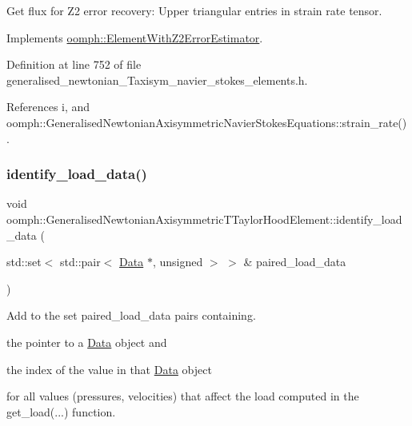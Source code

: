 Get \textquotesingle{}flux\textquotesingle{} for Z2 error recovery\+: Upper triangular entries in strain rate tensor. 



Implements \hyperlink{classoomph_1_1ElementWithZ2ErrorEstimator_a5688ff5f546d81771cabad82ca5a7556}{oomph\+::\+Element\+With\+Z2\+Error\+Estimator}.



Definition at line 752 of file generalised\+\_\+newtonian\+\_\+\+Taxisym\+\_\+navier\+\_\+stokes\+\_\+elements.\+h.



References i, and oomph\+::\+Generalised\+Newtonian\+Axisymmetric\+Navier\+Stokes\+Equations\+::strain\+\_\+rate().

\mbox{\label{classoomph_1_1GeneralisedNewtonianAxisymmetricTTaylorHoodElement_a2f7a2becd038eb8be0f69f1b3e2ce8c3}} 
\subsubsection{\texorpdfstring{identify\+\_\+load\+\_\+data()}{identify\_load\_data()}}
{\footnotesize\ttfamily void oomph\+::\+Generalised\+Newtonian\+Axisymmetric\+T\+Taylor\+Hood\+Element\+::identify\+\_\+load\+\_\+data (\begin{DoxyParamCaption}\item[{std\+::set$<$ std\+::pair$<$ \hyperlink{classoomph_1_1Data}{Data} $\ast$, unsigned $>$ $>$ \&}]{paired\+\_\+load\+\_\+data }\end{DoxyParamCaption})}



Add to the set {\ttfamily paired\+\_\+load\+\_\+data} pairs containing. 


\begin{DoxyItemize}
\item the pointer to a \hyperlink{classoomph_1_1Data}{Data} object and
\item the index of the value in that \hyperlink{classoomph_1_1Data}{Data} object
\end{DoxyItemize}for all values (pressures, velocities) that affect the load computed in the {\ttfamily get\+\_\+load}(...) function.

